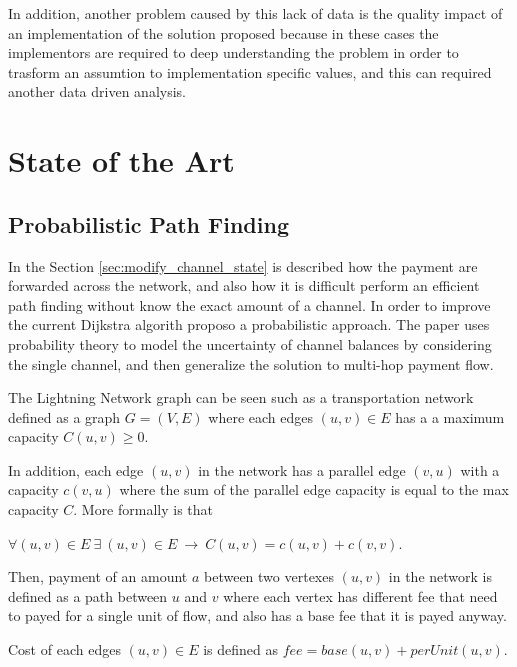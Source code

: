 In addition, another problem caused by this lack of data is the quality impact
of an implementation of the solution proposed because in these cases 
the implementors are required to deep understanding the problem 
in order to trasform an assumtion to implementation specific values, 
and this can required another data driven analysis.

\section{State of the Art}

\subsection{Probabilistic Path Finding}

In the Section \ref{sec:modify_channel_state} is described how the payment are
forwarded across the network, and also how it is difficult perform an efficient 
path finding without know the exact amount of a channel. 
In order to improve the current Dijkstra algorith \cite{DBLP:journals/corr/abs-2103-08576}
proposo a probabilistic approach.
The paper \cite{DBLP:journals/corr/abs-2103-08576} uses probability theory to 
model the uncertainty of channel balances by considering the single channel, 
and then generalize the solution to multi-hop payment flow.

The Lightning Network graph can be seen such as a transportation network 
defined as a graph $G = (V, E)$ where each edges $(u, v) \in E$ has a 
a maximum capacity $C(u, v) \ge 0$.

In addition, each edge $(u, v)$ in the network has a parallel edge $(v, u)$ 
with a capacity $c(v, u)$ where the sum of the parallel edge capacity is
equal to the max capacity $C$. More formally is that 

\begin{center}
    $\forall (u, v) \in E \: \exists \: (u, v) \in E \: \rightarrow \: C(u, v) = c(u, v) + c(v, v)$.
\end{center}

Then, payment of an amount $a$ between two vertexes $(u, v)$ in the network is defined 
as a path between $u$ and $v$ where each vertex has different fee that need to payed for a 
single unit of flow, and also has a base fee that it is payed anyway.

\begin{definition}
    Cost of each edges $(u, v) \in E$ is defined as $fee = base(u, v) + perUnit(u, v)$.
\end{definition}

